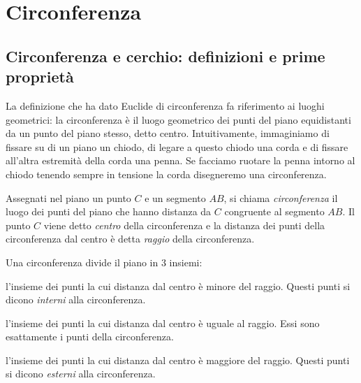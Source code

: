 
\chapter{Circonferenza}\label{chap:circonferenza}



\section{Circonferenza e cerchio: definizioni e prime proprietà}
\label{sect:circonferenza_cerchio_def}

La definizione che ha dato Euclide di circonferenza fa riferimento ai 
luoghi geometrici: la circonferenza è il luogo geometrico dei punti 
del piano equidistanti da un punto del piano stesso, detto centro.
Intuitivamente, immaginiamo di fissare su di un piano un chiodo, di 
legare a questo chiodo una corda e di fissare all'altra estremità 
della corda una penna. Se facciamo ruotare la penna intorno al chiodo 
tenendo sempre in tensione la corda disegneremo una circonferenza.

\begin{definizione}
Assegnati nel piano un punto \(C\) e un segmento \(AB\), si chiama 
\emph{circonferenza} il luogo dei punti del piano che hanno distanza 
da \(C\) congruente al segmento \(AB\). Il punto \(C\) viene detto 
\emph{centro} della circonferenza e la distanza dei punti della 
circonferenza dal centro è detta \emph{raggio} della circonferenza.
\end{definizione}

\osservazione Una circonferenza divide il piano in 3 insiemi:
\begin{itemize*}
\item l'insieme dei punti la cui distanza dal centro è minore del 
raggio. Questi punti si dicono \emph{interni} alla circonferenza.
\item l'insieme dei punti la cui distanza dal centro è uguale al 
raggio. Essi sono esattamente i punti della circonferenza.
\item l'insieme dei punti la cui distanza dal centro è maggiore del 
raggio. Questi punti si dicono \emph{esterni} alla circonferenza.
\end{itemize*}

